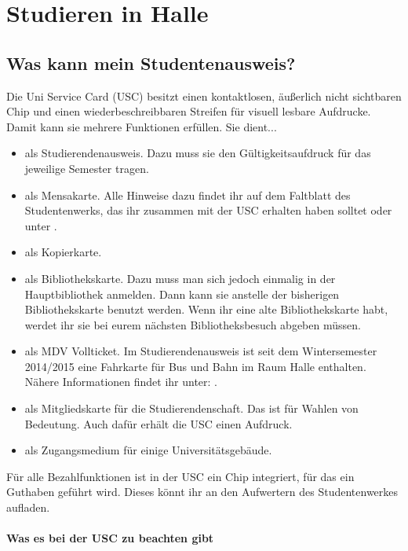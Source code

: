 
\section{Studieren in Halle}

\subsection{Was kann mein Studentenausweis?}
Die Uni Service Card (USC) besitzt einen kontaktlosen, äußerlich nicht sichtbaren Chip und einen wiederbeschreibbaren Streifen für visuell lesbare Aufdrucke.
Damit kann sie mehrere Funktionen erfüllen. Sie dient...

\begin{itemize}
 \item als Studierendenausweis.
       Dazu muss sie den Gültigkeitsaufdruck für das jeweilige Semester tragen.
 \item als Mensakarte.
       Alle Hinweise dazu findet ihr auf dem Faltblatt des Studentenwerks, das ihr zusammen mit der USC erhalten haben solltet
       oder unter .
 \item als Kopierkarte.
 \item als Bibliothekskarte.
       Dazu muss man sich jedoch einmalig in der Hauptbibliothek anmelden.
       Dann kann sie anstelle der bisherigen Bibliothekskarte benutzt werden.
       Wenn ihr eine alte Bibliothekskarte habt, werdet ihr sie bei eurem nächsten Bibliotheksbesuch abgeben müssen.
 \item als MDV Vollticket.
       Im Studierendenausweis ist seit dem Wintersemester 2014/2015 eine Fahrkarte für Bus und Bahn im Raum Halle enthalten. Nähere Informationen findet ihr unter: .
 \item als Mitgliedskarte für die Studierendenschaft.
       Das ist für Wahlen von Bedeutung.
       Auch dafür erhält die USC einen Aufdruck.
 \item als Zugangsmedium für einige Universitätsgebäude.
\end{itemize}

Für alle Bezahlfunktionen ist in der USC ein Chip integriert, für das ein Guthaben geführt wird.
Dieses könnt ihr an den Aufwertern des Studentenwerkes aufladen.

\clearpage %

\paragraph{Was es bei der USC zu beachten gibt}

